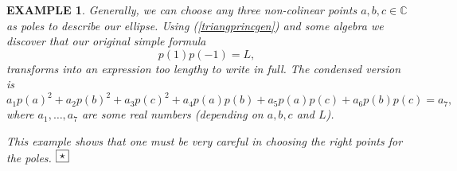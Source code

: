 \documentclass[10pt,a4paper,reqno]{amsart}
\newtheorem{exa}[defi]{\bf E\scriptsize XAMPLE \normalsize}
\def\kopr{\hfill\raisebox{3pt}{\framebox{$\star$}}}
\newenvironment{example}{\begin{exa}\rm}{$\kopr$\end{exa}}
\begin{document}
\begin{example}
Generally, we can choose any three non-colinear points $a,b,c\in\mathbb{C}$ as poles to describe our ellipse. Using (\ref{triangprincgen}) and some algebra we discover that our original simple formula
$$
p(1)p(-1)=L,
$$ 
transforms into an expression too lengthy to write in full. The condensed version is
$$
a_1 p(a)^2+a_2 p(b)^2+a_3 p(c)^2+a_4 p(a)p(b)+a_5p(a)p(c)+a_6p(b)p(c)=a_7,
$$
where $a_1,\dots, a_7$ are some real numbers (depending on $a,b,c$ and $L$).

This example shows that one must be very careful in choosing the right points for the poles.
\end{example}
\end{document}
